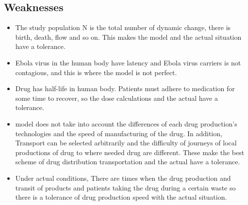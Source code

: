 \documentclass{icmmcm}
\begin{document}
\subsection{Weaknesses}
\begin{itemize}
  \item The study population N is the total number of dynamic
  change, there is birth, death, flow and so on. This makes the
  model and the actual situation have a tolerance.
  \item Ebola virus in the human body have latency and Ebola
  virus carriers is not contagious, and this is where the model
  is not perfect.
  \item  Drug has half-life in human body. Patients must adhere
  to medication for some time to recover, so the dose
  calculations and the actual have a tolerance.
  \item model does not take into account the differences of
  each drug production's technologies and the speed of
  manufacturing of the drug. In addition, Transport can be
  selected arbitrarily and the difficulty of journeys of local
  productions of drug to where needed drug are different. These
  make the best scheme of drug distribution transportation and
  the actual have a tolerance.
  \item Under actual conditions, There are times when the drug
  production and transit of products and patients taking the
  drug during a certain waste so there is a tolerance of drug
  production speed with the actual situation.
\end{itemize}
\end{document}
